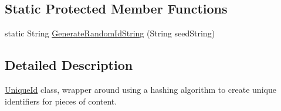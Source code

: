 \subsection*{Static Protected Member Functions}
\begin{DoxyCompactItemize}
\item 
static String \hyperlink{classcom_1_1ualberta_1_1team17_1_1_unique_id_abbafafc7c21c68a0dd72f7726e905ab4}{Generate\+Random\+Id\+String} (String seed\+String)
\end{DoxyCompactItemize}


\subsection{Detailed Description}
\hyperlink{classcom_1_1ualberta_1_1team17_1_1_unique_id}{Unique\+Id} class, wrapper around using a hashing algorithm to create unique identifiers for pieces of content. 

